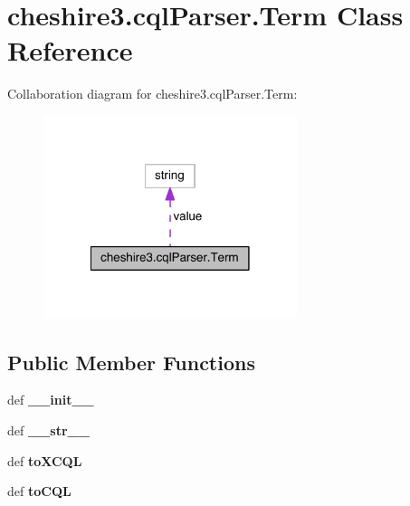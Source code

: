 \hypertarget{classcheshire3_1_1cql_parser_1_1_term}{\section{cheshire3.\-cql\-Parser.\-Term Class Reference}
\label{classcheshire3_1_1cql_parser_1_1_term}
}


Collaboration diagram for cheshire3.\-cql\-Parser.\-Term\-:
\nopagebreak
\begin{figure}[H]
\begin{center}
\leavevmode
\includegraphics[width=210pt]{classcheshire3_1_1cql_parser_1_1_term__coll__graph}
\end{center}
\end{figure}
\subsection*{Public Member Functions}
\begin{DoxyCompactItemize}
\item 
\hypertarget{classcheshire3_1_1cql_parser_1_1_term_af690a9853565e451980900303238af30}{def {\bfseries \-\_\-\-\_\-init\-\_\-\-\_\-}}\label{classcheshire3_1_1cql_parser_1_1_term_af690a9853565e451980900303238af30}

\item 
\hypertarget{classcheshire3_1_1cql_parser_1_1_term_a09f8e0e480b57bcc78be96ac33dd6d38}{def {\bfseries \-\_\-\-\_\-str\-\_\-\-\_\-}}\label{classcheshire3_1_1cql_parser_1_1_term_a09f8e0e480b57bcc78be96ac33dd6d38}

\item 
\hypertarget{classcheshire3_1_1cql_parser_1_1_term_a566b2603ceb375f7b5f17965085eaa38}{def {\bfseries to\-X\-C\-Q\-L}}\label{classcheshire3_1_1cql_parser_1_1_term_a566b2603ceb375f7b5f17965085eaa38}

\item 
\hypertarget{classcheshire3_1_1cql_parser_1_1_term_a590d2edeac2fe6749f56ca08b8400e67}{def {\bfseries to\-C\-Q\-L}}\label{classcheshire3_1_1cql_parser_1_1_term_a590d2edeac2fe6749f56ca08b8400e67}

\end{DoxyCompactItemize}
